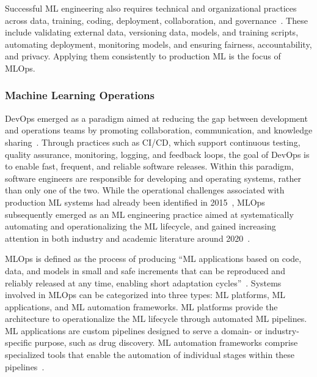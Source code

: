 \documentclass[
english,                 %
bibtex,                  %
]{kththesis}
\numberwithin{listing}{chapter}
\begin{document}
Successful \gls{ML} engineering also requires technical and organizational practices across data, training, coding, deployment, collaboration, and governance~\cite{serban_adoption_2020}. These include validating external data, versioning data, models, and training scripts, automating deployment, monitoring models, and ensuring fairness, accountability, and privacy. Applying them consistently to production \gls{ML} is the focus of \gls{MLOps}.

\subsubsection{Machine Learning Operations}
\label{sec:bg_mlops}

\Gls{DevOps} emerged as a paradigm aimed at reducing the gap between development and operations teams by promoting collaboration, communication, and knowledge sharing~\cite{kreuzberger_machine_2023}. Through practices such as \gls{CI/CD}, which support continuous testing, quality assurance, monitoring, logging, and feedback loops, the goal of \gls{DevOps} is to enable fast, frequent, and reliable software releases. Within this paradigm, software engineers are responsible for developing and operating systems, rather than only one of the two. While the operational challenges associated with production \gls{ML} systems had already been identified in 2015~\cite{sculley_hidden_2015}, \gls{MLOps} subsequently emerged as an \gls{ML} engineering practice aimed at systematically automating and operationalizing the \gls{ML} lifecycle, and gained increasing attention in both industry and academic literature around 2020~\cite{tamburri_sustainable_2020}.

\Gls{MLOps} is defined as the process of producing “\gls{ML} applications based on code, data, and models in small and safe increments that can be reproduced and reliably released at any time, enabling short adaptation cycles”~\cite{makinen_who_2021}. Systems involved in \gls{MLOps} can be categorized into three types: \gls{ML} platforms, \gls{ML} applications, and \gls{ML} automation frameworks. \Gls{ML} platforms provide the architecture to operationalize the \gls{ML} lifecycle through automated \gls{ML} pipelines. \Gls{ML} applications are custom pipelines designed to serve a domain- or industry-specific purpose, such as drug discovery. \Gls{ML} automation frameworks comprise specialized tools that enable the automation of individual stages within these pipelines~\cite{testi_mlops_2022}.
\end{document}
